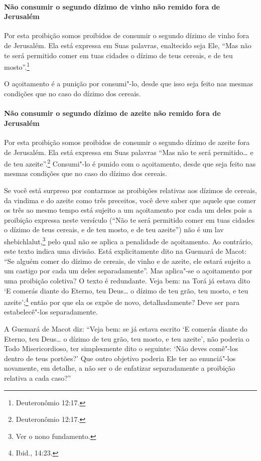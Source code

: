 \begin{multicols}{2}
\paragraph{Não consumir o segundo dízimo de vinho não remido fora de Jerusalém}

Por esta proibição somos proibidos de consumir o segundo dízimo de vinho
fora de Jerusalém. Ela está expressa em Suas palavras, enaltecido seja
Ele, ``Mas não te será permitido comer em tuas cidades o dízimo de teus
cereais, e de teu mosto''.\footnote{Deuteronômio 12:17.}

O açoitamento é a punição por consumi"-lo, desde que isso seja feito nas
mesmas condições que no caso do dízimo dos cereais.

\paragraph{Não consumir o segundo dízimo de azeite não remido fora de Jerusalém}

Por esta proibição somos proibidos de consumir o segundo dízimo de
azeite fora de Jerusalém. Ela está expressa em Suas palavras ``Mas não
te será permitido\ldots{} e de teu azeite''.\footnote{Deuteronômio 12:17.} Consumi"-lo
é punido com o açoitamento, desde que seja feito nas mesmas condições
que no caso do dízimo dos cereais.

Se você está surpreso por contarmos as proibições relativas aos dízimos
de cereais, da vindima e do azeite como três preceitos, você deve saber
que aquele que comer os três ao mesmo tempo está sujeito a um
açoitamento por cada um deles pois a proibição expressa neste versículo
(``Não te será permitido comer em tuas cidades o dízimo de teus
cereais, e de teu mosto, e de teu azeite'') não é um lav shebichlalut\starr,\footnote{Ver o nono fundamento.} pelo qual não se aplica a
penalidade de açoitamento. Ao contrário, este texto indica uma divisão.
Está explicitamente dito na Guemará\starr{} de Macot\starr: ``Se alguém comer do
dízimo de cereais, de vinho e de azeite, ele estará sujeito a um castigo
por cada um deles separadamente''. Mas aplica"-se o açoitamento por uma
proibição coletiva? O texto é redundante. Veja bem: na Torá\starr{} já estava
dito `E comerás diante do Eterno, teu Deus\ldots{} o dízimo de teu grão, teu
mosto, e teu azeite';\footnote{Ibid., 14:23.} então por que ela os expõe de novo,
detalhadamente? Deve ser para estabelecê"-los separadamente.

A Guemará\starr{} de Macot\starr{} diz: ``Veja bem: se já estava escrito `E comerás
diante do Eterno, teu Deus\ldots{} o dízimo de teu grão, teu mosto, e teu
azeite', não poderia o Todo Misericordioso, ter simplesmente dito o
seguinte: `Não deves comê"-los dentro de teus portões?' Que outro
objetivo poderia Ele ter ao enunciá"-los novamente, em detalhe, a não ser
o de enfatizar separadamente a proibição relativa a cada caso?''


\end{multicols}
